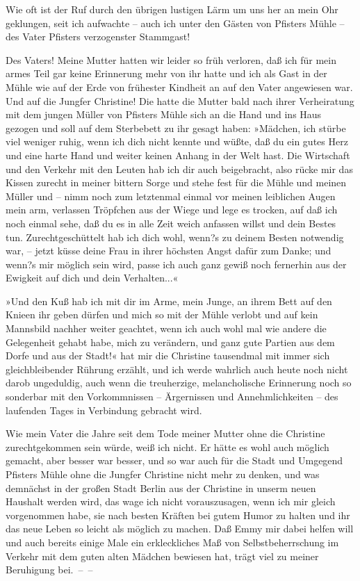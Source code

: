Wie oft ist der Ruf durch den übrigen lustigen Lärm um uns her an
mein Ohr geklungen, seit ich aufwachte – auch ich unter den Gästen
von Pfisters Mühle – des Vater Pfisters verzogenster Stammgast!

Des Vaters! Meine Mutter hatten wir leider so früh verloren, daß
ich für mein armes Teil gar keine Erinnerung mehr von ihr hatte und
ich als Gast in der Mühle wie auf der Erde von frühester Kindheit
an auf den Vater angewiesen war. Und auf die Jungfer Christine! Die
hatte die Mutter bald nach ihrer Verheiratung mit dem jungen Müller
von Pfisters Mühle sich an die Hand und ins Haus gezogen und soll
auf dem Sterbebett zu ihr gesagt haben: »Mädchen, ich stürbe viel
weniger ruhig, wenn ich dich nicht kennte und wüßte, daß du ein
gutes Herz und eine harte Hand und weiter keinen Anhang in der Welt
hast. Die Wirtschaft und den Verkehr mit den Leuten hab ich dir
auch beigebracht, also rücke mir das Kissen zurecht in meiner
bittern Sorge und stehe fest für die Mühle und meinen Müller und –
nimm noch zum letztenmal einmal vor meinen leiblichen Augen mein
arm, verlassen Tröpfchen aus der Wiege und lege es trocken, auf daß
ich noch einmal sehe, daß du es in alle Zeit weich anfassen willst
und dein Bestes tun. Zurechtgeschüttelt hab ich dich wohl, wenn?s
zu deinem Besten notwendig war, – jetzt küsse deine Frau in ihrer
höchsten Angst dafür zum Danke; und wenn?s mir möglich sein wird,
passe ich auch ganz gewiß noch fernerhin aus der Ewigkeit auf dich
und dein Verhalten...«

»Und den Kuß hab ich mit dir im Arme, mein Junge, an ihrem Bett auf
den Knieen ihr geben dürfen und mich so mit der Mühle verlobt und
auf kein Mannsbild nachher weiter geachtet, wenn ich auch wohl mal
wie andere die Gelegenheit gehabt habe, mich zu verändern, und ganz
gute Partien aus dem Dorfe und aus der Stadt!« hat mir die
Christine tausendmal mit immer sich gleichbleibender Rührung
erzählt, und ich werde wahrlich auch heute noch nicht darob
ungeduldig, auch wenn die treuherzige, melancholische Erinnerung
noch so sonderbar mit den Vorkommnissen – Ärgernissen und
Annehmlichkeiten – des laufenden Tages in Verbindung gebracht
wird.

Wie mein Vater die Jahre seit dem Tode meiner Mutter ohne die
Christine zurechtgekommen sein würde, weiß ich nicht. Er hätte es
wohl auch möglich gemacht, aber besser war besser, und so war auch
für die Stadt und Umgegend Pfisters Mühle ohne die Jungfer
Christine nicht mehr zu denken, und was demnächst in der großen
Stadt Berlin aus der Christine in unserm neuen Haushalt werden
wird, das wage ich nicht vorauszusagen, wenn ich mir gleich
vorgenommen habe, sie nach besten Kräften bei gutem Humor zu halten
und ihr das neue Leben so leicht als möglich zu machen. Daß Emmy
mir dabei helfen will und auch bereits einige Male ein
erkleckliches Maß von Selbstbeherrschung im Verkehr mit dem guten
alten Mädchen bewiesen hat, trägt viel zu meiner Beruhigung
bei.~–~–

